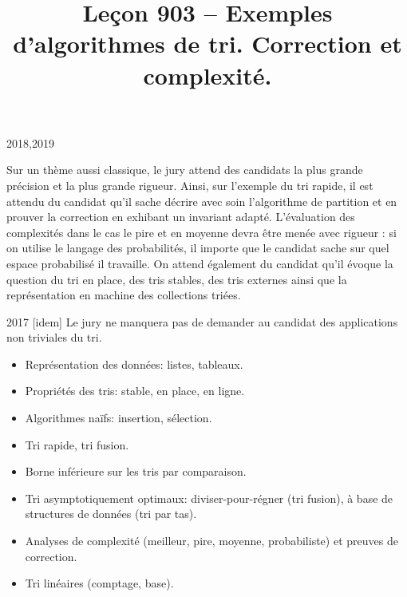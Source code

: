 \documentclass{agregfiche}
\title{Leçon 903 -- Exemples d'algorithmes de tri. Correction et complexité.}
\begin{document}
\maketitle

\secrapports

\begin{rapport}{2018,2019}

	Sur un thème aussi classique, le jury attend des candidats la plus grande précision et la plus grande rigueur.
	Ainsi, sur l'exemple du tri rapide, il est attendu du candidat qu'il sache décrire avec soin l'algorithme de partition et en prouver la correction en exhibant un invariant adapté. L'évaluation des complexités dans le cas le pire et en moyenne devra être menée avec rigueur : si on utilise le langage des probabilités, il importe que le candidat sache sur quel espace probabilisé il travaille.
	On attend également du candidat qu'il évoque la question du tri en place, des tris stables, des tris externes ainsi que la représentation en machine des collections triées.

\end{rapport}

\begin{rapport}{2017}
    [idem]
    Le jury ne manquera pas de demander au candidat des applications non triviales du tri.
\end{rapport}

\secindispensables

\begin{itemize}
    \item Représentation des données: listes, tableaux.
    \item Propriétés des tris: stable, en place, en ligne.
    \item Algorithmes naïfs: insertion, sélection.
   \item Tri rapide, tri fusion.
\end{itemize}

\secasavoir
\begin{itemize}
    \item Borne inférieure sur les tris par comparaison.
    \item Tri asymptotiquement optimaux: diviser-pour-régner (tri fusion), à base de structures de données (tri par tas).
	\item Analyses de complexité (meilleur, pire, moyenne, probabiliste) et preuves de correction.
	\item Tri linéaires (comptage, base).
\end{itemize}
\end{document}
